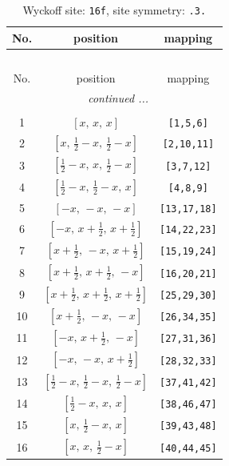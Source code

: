 \documentclass[fleqn,8pt]{jsarticle}
\begin{document}
\begin{longtable}{ccc}
\caption{Wyckoff site: {\tt 16f}, site symmetry: {\tt .3.}}
 \\
 \hline \hline
No. & position & mapping \\ \hline \endfirsthead

\multicolumn{2}{l}{\tablename\ \thetable{}} \\
 \hline \hline
No. & position & mapping \\ \hline \endhead

 \hline \hline
\multicolumn{2}{r}{\footnotesize\it continued ...} \\ \endfoot

 \hline \hline
\multicolumn{2}{r}{} \\ \endlastfoot

1 & $\left[ x,\, x,\, x \right]$ & {\tt [1,5,6]} \\ \hline
2 & $\left[ x,\, \frac{1}{2} - x,\, \frac{1}{2} - x \right]$ & {\tt [2,10,11]} \\ \hline
3 & $\left[ \frac{1}{2} - x,\, x,\, \frac{1}{2} - x \right]$ & {\tt [3,7,12]} \\ \hline
4 & $\left[ \frac{1}{2} - x,\, \frac{1}{2} - x,\, x \right]$ & {\tt [4,8,9]} \\ \hline
5 & $\left[ - x,\, - x,\, - x \right]$ & {\tt [13,17,18]} \\ \hline
6 & $\left[ - x,\, x + \frac{1}{2},\, x + \frac{1}{2} \right]$ & {\tt [14,22,23]} \\ \hline
7 & $\left[ x + \frac{1}{2},\, - x,\, x + \frac{1}{2} \right]$ & {\tt [15,19,24]} \\ \hline
8 & $\left[ x + \frac{1}{2},\, x + \frac{1}{2},\, - x \right]$ & {\tt [16,20,21]} \\ \hline
9 & $\left[ x + \frac{1}{2},\, x + \frac{1}{2},\, x + \frac{1}{2} \right]$ & {\tt [25,29,30]} \\ \hline
10 & $\left[ x + \frac{1}{2},\, - x,\, - x \right]$ & {\tt [26,34,35]} \\ \hline
11 & $\left[ - x,\, x + \frac{1}{2},\, - x \right]$ & {\tt [27,31,36]} \\ \hline
12 & $\left[ - x,\, - x,\, x + \frac{1}{2} \right]$ & {\tt [28,32,33]} \\ \hline
13 & $\left[ \frac{1}{2} - x,\, \frac{1}{2} - x,\, \frac{1}{2} - x \right]$ & {\tt [37,41,42]} \\ \hline
14 & $\left[ \frac{1}{2} - x,\, x,\, x \right]$ & {\tt [38,46,47]} \\ \hline
15 & $\left[ x,\, \frac{1}{2} - x,\, x \right]$ & {\tt [39,43,48]} \\ \hline
16 & $\left[ x,\, x,\, \frac{1}{2} - x \right]$ & {\tt [40,44,45]} \\
\end{longtable}
\end{document}
